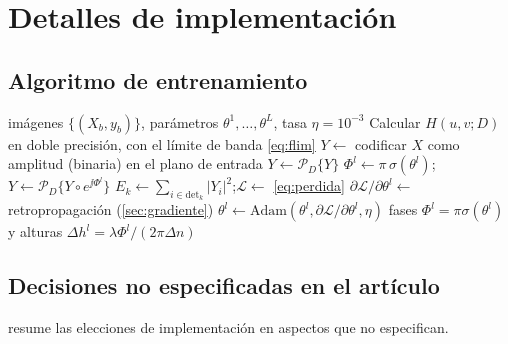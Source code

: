 \chapter{Detalles de implementación}\label{ap:implementacion}

\section{Algoritmo de entrenamiento}

\begin{algorithm}[htb]
\caption{Entrenamiento de la D\textsuperscript{2}NN}\label{alg:entrenamiento}
\begin{algorithmic}[1]
\Require imágenes $\{(X_b,y_b)\}$, parámetros $\theta^1,\dots,\theta^L$, tasa $\eta=10^{-3}$
\State Calcular $H(u,v;D)$ en doble precisión, con el límite de banda \eqref{eq:flim}
    \State $Y\gets$ codificar $X$ como amplitud (binaria) en el plano de entrada
    \State $Y\gets\mathcal{P}_D\{Y\}$
       \State $\Phi^l\gets\pi\,\sigma(\theta^l)$;\quad $Y\gets\mathcal{P}_D\{Y\circ e^{\jj\Phi^l}\}$
    \EndFor
    \State $E_k\gets\sum_{i\in\text{det}_k}|Y_i|^2$;\quad $\mathcal{L}\gets$ \cref{eq:perdida}
    \State $\partial\mathcal{L}/\partial\theta^l\gets$ retropropagación (\cref{sec:gradiente})
    \State $\theta^l\gets\mathrm{Adam}(\theta^l,\partial\mathcal{L}/\partial\theta^l,\eta)$
  \EndFor
\EndFor
\Ensure fases $\Phi^l=\pi\sigma(\theta^l)$ y alturas $\Delta h^l=\lambda\Phi^l/(2\pi\Delta n)$
\end{algorithmic}
\end{algorithm}

\section{Decisiones no especificadas en el artículo}

 resume las elecciones de implementación en aspectos que \textcite{chen2021} no especifican.

